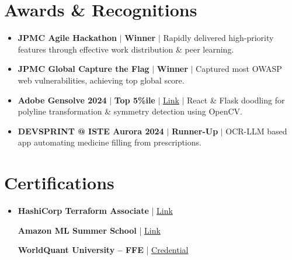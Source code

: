 \documentclass[10pt]{article}
\newcommand{\resumeCertHeading}[1]{
    \item \small #1 \vspace{-4.5pt}
}
\newcommand{\resumeCertThreeColumns}[3]{
  \item
    \begin{minipage}[t]{0.30\textwidth}
      \scriptsize #1
    \end{minipage}%
    \hspace{0.02\textwidth}
    \begin{minipage}[t]{0.30\textwidth}
      \scriptsize #2
    \end{minipage}%
    \hspace{0.02\textwidth}
    \begin{minipage}[t]{0.30\textwidth}
      \scriptsize #3
    \end{minipage}\vspace{-8pt}
}
\newcommand{\resumeSubHeadingListStart}{\vspace{-1pt}\begin{itemize}[leftmargin=0.08 in, label={}]}
\newcommand{\resumeSubHeadingListEnd}{\end{itemize}}
\begin{document}
\section{Awards \& Recognitions}
\resumeSubHeadingListStart
\resumeCertHeading
{\textbf{JPMC Agile Hackathon} $|$ \textbf{Winner} $|$ Rapidly delivered high-priority features through effective work distribution \& peer learning.}
\resumeCertHeading
{\textbf{JPMC Global Capture the Flag} $|$ \textbf{Winner} $|$ Captured most OWASP web vulnerabilities, achieving top global score.}
\resumeCertHeading
{\textbf{Adobe Gensolve 2024} $|$ \textbf{Top 5\%ile} $|$ \href{https://drive.google.com/file/d/1pWoLmEphNQBDTTapcTiruJGMoiKKBAM_/view?usp=sharing}{Link} $|$ React \& Flask doodling for polyline transformation \& symmetry detection using OpenCV.}
\resumeCertHeading
{\textbf{DEVSPRINT @ ISTE Aurora 2024} $|$ \textbf{Runner-Up} $|$ OCR-LLM based app automating medicine filling from prescriptions.}
\resumeSubHeadingListEnd


\section{Certifications}
\resumeSubHeadingListStart
\resumeCertThreeColumns
{\textbf{HashiCorp Terraform Associate} | \href{https://www.credly.com/badges/8c767383-3f07-4103-881c-bd0f7b1eba3a/public_url}{Link}}
{\textbf{Amazon ML Summer School} | \href{https://drive.google.com/file/d/1Pe39ukmHHIuC-mangq8pGkVITWgn6Cvx/view}{Link}}
{\textbf{WorldQuant University – FFE} | \href{https://www.credly.com/badges/f7aadcde-f2dc-4137-8958-e93a1c89415f}{Credential}}
\resumeSubHeadingListEnd
\end{document}
